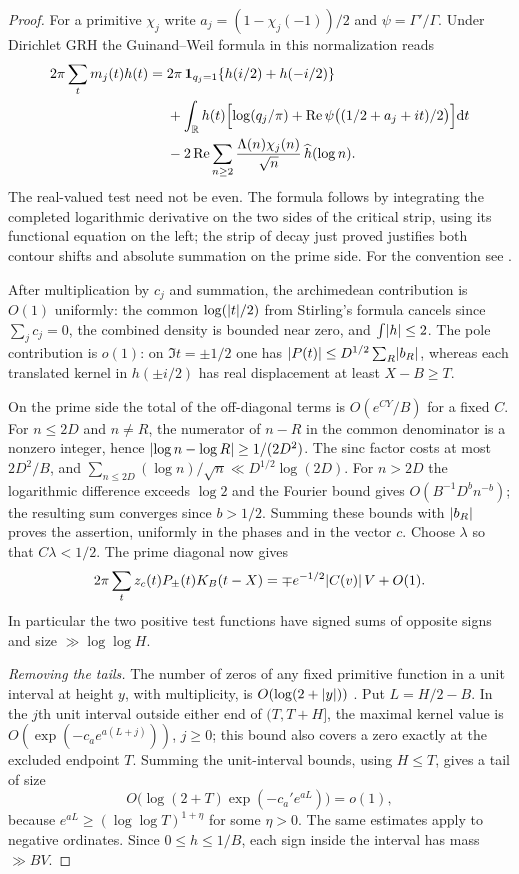 \begin{proof}
For a primitive $\chi_j$ write $a_j=(1-\chi_j(-1))/2$ and $\psi=\Gamma'/\Gamma$. Under
Dirichlet GRH the Guinand--Weil formula in this normalization reads
\begin{align*}
 2\pi\sum_tm_j(t)h(t)={}&2\pi\,\mathbf 1_{q_j=1}\{h(i/2)+h(-i/2)\}\\
 &+\int_{\mathbb{R}} h(t)\Bigl[\log(q_j/\pi)+\operatorname{Re}\psi\bigl((1/2+a_j+it)/2\bigr)\Bigr]\mathrm{d} t\\
 &-2\operatorname{Re}\sum_{n\ge2}\frac{\Lambda(n)\chi_j(n)}{\sqrt n}\,\widehat h(\log n).
\end{align*}
The real-valued test need not be even. The formula follows by integrating the completed
logarithmic derivative on the two sides of the critical strip, using its functional
equation on the left; the strip of decay just proved justifies both contour shifts and
absolute summation on the prime side. For the convention see
\cite[\S5]{FourierOptimizationQuadratic}.

After multiplication by $c_j$ and summation, the archimedean contribution is $O(1)$
uniformly: the common $\log(\lvert t\rvert/2)$ from Stirling's formula cancels since
$\sum_jc_j=0$, the combined density is bounded near zero, and $\int\lvert h\rvert\le2$. The pole
contribution is $o(1)$: on $\Im t=\pm1/2$ one has $\lvert P(t)\rvert\le D^{1/2}\sum_R\lvert b_R\rvert$,
whereas each translated kernel in $h(\pm i/2)$ has real displacement at least $X-B\ge T$.

On the prime side the total of the off-diagonal terms is $O(e^{CY}/B)$ for a fixed $C$. For
$n\le2D$ and $n\ne R$, the numerator of $n-R$ in the common denominator is a nonzero
integer, hence $\lvert\log n-\log R\rvert\ge1/(2D^2)$. The sinc factor costs at most $2D^2/B$, and
$\sum_{n\le2D}(\log n)/\sqrt n\ll D^{1/2}\log(2D)$. For $n>2D$ the logarithmic difference
exceeds $\log2$ and the Fourier bound gives $O(B^{-1}D^bn^{-b})$; the resulting sum
converges since $b>1/2$. Summing these bounds with $\lvert b_R\rvert$ proves the assertion,
uniformly in the phases and in the vector $c$. Choose $\lambda$ so that $C\lambda<1/2$. The
prime diagonal now gives
\[
 2\pi\sum_tz_c(t)P_\pm(t)K_B(t-X)=\mp e^{-1/2}\lvert C(v)\rvert\,V+O(1).
\]
In particular the two positive test functions have signed sums of opposite signs and size
$\gg\log\log H$.

\emph{Removing the tails.} The number of zeros of any fixed primitive function in a unit
interval at height $y$, with multiplicity, is $O(\log(2+\lvert y\rvert))$
\cite{BennettMartinOBryantRechnitzer2021Counting}. Put $L=H/2-B$. In the $j$th unit
interval outside either end of $(T,T+H]$, the maximal kernel value is
$O(\exp(-c_ae^{a(L+j)}))$, $j\ge0$; this bound also covers a zero exactly at the excluded
endpoint $T$. Summing the unit-interval bounds, using $H\le T$, gives a tail of size
\[
 O\bigl(\log(2+T)\exp(-c_a'e^{aL})\bigr)=o(1),
\]
because $e^{aL}\ge(\log\log T)^{1+\eta}$ for some $\eta>0$. The same estimates apply to
negative ordinates. Since $0\le h\le1/B$, each sign inside the interval has mass $\gg BV$.
\end{proof}

